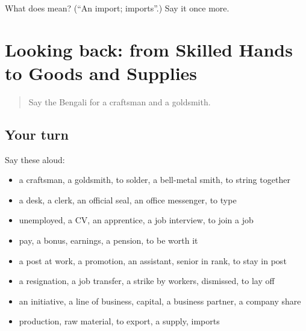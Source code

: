 \begin{tcolorbox}[breakable,colback=teal!4,colframe=teal!35!black,title={Before you move on}]
What does  mean? (\textquotedblleft{}An import; imports\textquotedblright{}.) Say it once more.
\end{tcolorbox}
\section[(dialogue)]{Looking back: from Skilled Hands to Goods and Supplies}

\label{lesson:BN-R499-review-492-499}



\begin{quote}
Say the Bengali for a craftsman and a goldsmith.
\end{quote}

\subsection*{Your turn}
Say these aloud:

\begin{itemize}
\raggedright
  \item a craftsman, a goldsmith, to solder, a bell-metal smith, to string together
  \item a desk, a clerk, an official seal, an office messenger, to type
  \item unemployed, a CV, an apprentice, a job interview, to join a job
  \item pay, a bonus, earnings, a pension, to be worth it
  \item a post at work, a promotion, an assistant, senior in rank, to stay in post
  \item a resignation, a job transfer, a strike by workers, dismissed, to lay off
  \item an initiative, a line of business, capital, a business partner, a company share
  \item production, raw material, to export, a supply, imports
\end{itemize}

